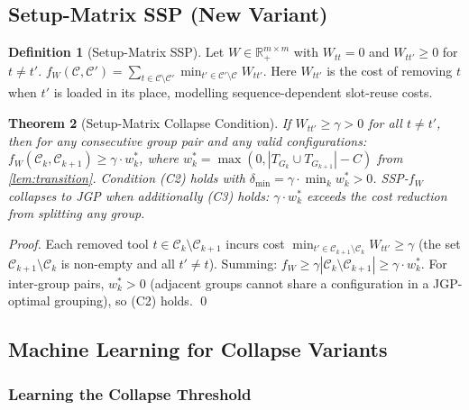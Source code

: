 \documentclass[11pt,a4paper]{article}
\theoremstyle{plain}
\newtheorem{theorem}{Theorem}[section]
\theoremstyle{definition}
\newtheorem{definition}[theorem]{Definition}
\begin{document}
\subsection{Setup-Matrix SSP (New Variant)}
\label{sec:setupmatrix}

\begin{definition}[Setup-Matrix SSP]
Let $W\in\mathbb{R}^{m\times m}_+$ with $W_{tt}=0$ and $W_{tt'}\ge 0$ for $t\ne t'$.
$f_W(\mathcal{C},\mathcal{C}')=\sum_{t\in\mathcal{C}\setminus\mathcal{C}'}
\min_{t'\in\mathcal{C}'\setminus\mathcal{C}}W_{tt'}$.
Here $W_{tt'}$ is the cost of removing $t$ when $t'$ is loaded in its place,
modelling sequence-dependent slot-reuse costs.
\end{definition}

\begin{thmbox}
\begin{theorem}[Setup-Matrix Collapse Condition]
\label{thm:setupmatrix}
If $W_{tt'}\ge\gamma>0$ for all $t\ne t'$, then for any consecutive group pair and
any valid configurations: $f_W(\mathcal{C}_k,\mathcal{C}_{k+1})\ge\gamma\cdot w^*_k$,
where $w^*_k=\max(0,|T_{G_k}\cup T_{G_{k+1}}|-C)$ from \cref{lem:transition}.
Condition (C2) holds with $\delta_{\min}=\gamma\cdot\min_k w^*_k>0$.
SSP-$f_W$ collapses to JGP when additionally (C3) holds:
$\gamma\cdot w^*_k$ exceeds the cost reduction from splitting any group.
\end{theorem}
\end{thmbox}

\begin{proof}
Each removed tool $t\in\mathcal{C}_k\setminus\mathcal{C}_{k+1}$ incurs cost
$\min_{t'\in\mathcal{C}_{k+1}\setminus\mathcal{C}_k}W_{tt'}\ge\gamma$
(the set $\mathcal{C}_{k+1}\setminus\mathcal{C}_k$ is non-empty and all $t'\ne t$).
Summing: $f_W\ge\gamma|\mathcal{C}_k\setminus\mathcal{C}_{k+1}|\ge\gamma\cdot w^*_k$.
For inter-group pairs, $w^*_k>0$ (adjacent groups cannot share a configuration
in a JGP-optimal grouping), so (C2) holds. \qed
\end{proof}

\subsection{Machine Learning for Collapse Variants}
\label{sec:ML-collapse}

\subsubsection{Learning the Collapse Threshold}
\end{document}
